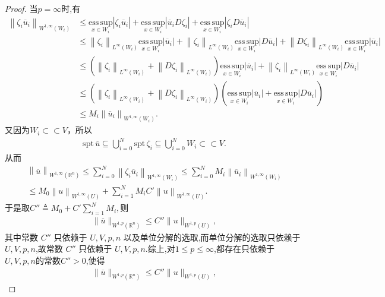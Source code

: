\documentclass[../../main.tex]{subfiles}
\begin{document}
\begin{proof}
当$p=\infty$时,有
\begin{align*}
\left\| \zeta _i\overline{u}_i \right\| _{W^{1,\infty}\left( W_i \right)}&\leqslant \underset{x\in W_i}{\mathrm{ess}\,\mathrm{sup}}\left| \zeta _i\overline{u}_i \right|+\underset{x\in W_i}{\mathrm{ess}\,\mathrm{sup}}\left| \overline{u}_iD\zeta _i \right|+\underset{x\in W_i}{\mathrm{ess}\,\mathrm{sup}}\left| \zeta _iD\overline{u}_i \right|
\\
&\leqslant \left\| \zeta _i \right\| _{L^{\infty}\left( W_i \right)}\underset{x\in W_i}{\mathrm{ess}\,\mathrm{sup}}\left| \overline{u}_i \right|+\left\| \zeta _i \right\| _{L^{\infty}\left( W_i \right)}\underset{x\in W_i}{\mathrm{ess}\,\mathrm{sup}}\left| D\overline{u}_i \right|+\left\| D\zeta _i \right\| _{L^{\infty}\left( W_i \right)}\underset{x\in W_i}{\mathrm{ess}\,\mathrm{sup}}\left| \overline{u}_i \right|
\\
&\leqslant \left( \left\| \zeta _i \right\| _{L^{\infty}\left( W_i \right)}+\left\| D\zeta _i \right\| _{L^{\infty}\left( W_i \right)} \right) \underset{x\in W_i}{\mathrm{ess}\,\mathrm{sup}}\left| \overline{u}_i \right|+\left\| \zeta _i \right\| _{L^{\infty}\left( W_i \right)}\underset{x\in W_i}{\mathrm{ess}\,\mathrm{sup}}\left| D\overline{u}_i \right|
\\
&\leqslant \left( \left\| \zeta _i \right\| _{L^{\infty}\left( W_i \right)}+\left\| D\zeta _i \right\| _{L^{\infty}\left( W_i \right)} \right) \left( \underset{x\in W_i}{\mathrm{ess}\,\mathrm{sup}}\left| \overline{u}_i \right|+\underset{x\in W_i}{\mathrm{ess}\,\mathrm{sup}}\left| D\overline{u}_i \right| \right) 
\\
&\leqslant M_{i}\left\| \overline{u}_i \right\| _{W^{1,\infty}\left( W_i \right)}.
\end{align*}
又因为$W_i\subset \subset V$，所以
\begin{align*}
\mathrm{spt}\,\overline{u}\subseteq \bigcup_{i=0}^N{\mathrm{spt}\,\zeta _i}\subseteq \bigcup_{i=0}^N{W_i}\subset \subset V.
\end{align*}
从而
\begin{align*}
\left\| \overline{u} \right\| _{W^{1,\infty}\left( \mathbb{R} ^n \right)}\leqslant \sum_{i=0}^N{\left\| \zeta _i\overline{u}_i \right\| _{W^{1,\infty}\left( W_i \right)}}\leqslant \sum_{i=0}^N{M_{i}}\left\| \overline{u}_i \right\| _{W^{1,\infty}\left( W_i \right)}
\\
\leqslant M_{0}\left\| u \right\| _{W^{1,\infty}\left( U \right)}+\sum_{i=1}^N{M_{i}C\prime}\left\| u \right\| _{W^{1,\infty}\left( U \right)}.
\end{align*}
于是取$C'' \triangleq M_0 + C' \sum\limits_{i=1}^N M_i,$则
\begin{align*}
\|\overline{u}\|_{W^{1,p}(\mathbb{R}^n)}\leqslant C''\|u\|_{W^{1,p}(U)},
\end{align*}
其中常数 \(C''\) 只依赖于 \(U,V,p,n\) 以及单位分解的选取,而单位分解的选取只依赖于\(U,V,p,n\),故常数 \(C''\) 只依赖于 \(U,V,p,n\).综上,对$1\leqslant p\leqslant \infty$,都存在只依赖于 \(U,V,p,n\)的常数$C''>0$,使得
\begin{align}\label{eq::fjiwjio233--12}
\|\overline{u}\|_{W^{1,p}(\mathbb{R}^n)}\leqslant C''\|u\|_{W^{1,p}(U)},
\end{align}


\end{proof}
\end{document}
